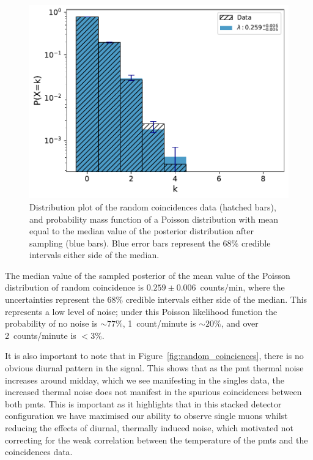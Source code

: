 \begin{figure}[ht!]
	\centering
	\includegraphics[width=0.8\columnwidth]{random_noise_fitted_poisson.pdf}
	\caption{Distribution plot of the random coincidences data (hatched bars), and probability mass function of a Poisson distribution with mean equal to the median value of the posterior distribution after sampling (blue bars). Blue error bars represent the $68 \%$ credible intervals either side of the median.}
	\label{fig:random_coinciences_dist}
\end{figure}

The median value of the sampled posterior of the mean value of the Poisson distribution of random coincidence is $0.259 \pm 0.006$~counts/min, where the uncertainties represent the $68 \%$ credible intervals either side of the median. This represents a low level of noise; under this Poisson likelihood function the probability of no noise is $\sim 77 \%$, 1~count/minute is $\sim 20 \%$, and over 2~counts/minute is $< 3 \%$.

It is also important to note that in Figure~\ref{fig:random_coinciences}, there is no obvious diurnal pattern in the signal. This shows that as the \gls{pmt} thermal noise increases around midday, which we see manifesting in the singles data, the increased thermal noise does not manifest in the spurious coincidences between both \glspl{pmt}. This is important as it highlights that in this stacked detector configuration we have maximised our ability to observe single muons whilst reducing the effects of diurnal, thermally induced noise, which motivated not correcting for the weak correlation between the temperature of the \glspl{pmt} and the coincidences data.



